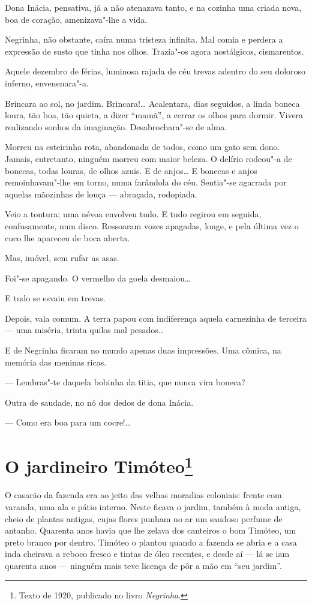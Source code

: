 Dona Inácia, pensativa, já a não atenazava tanto, e na cozinha uma
criada nova, boa de coração, amenizava"-lhe a vida.

Negrinha, não obstante, caíra numa tristeza infinita. Mal comia e
perdera a expressão de susto que tinha nos olhos. Trazia"-os agora
nostálgicos, cismarentos.

Aquele dezembro de férias, luminosa rajada de céu trevas adentro do seu
doloroso inferno, envenenara"-a.

Brincara ao sol, no jardim. Brincara!\ldots{} Acalentara, dias seguidos, a
linda boneca loura, tão boa, tão quieta, a dizer ``mamã'', a cerrar os
olhos para dormir. Vivera realizando sonhos da imaginação.
Desabrochara"-se de alma.

Morreu na esteirinha rota, abandonada de todos, como um gato sem dono.
Jamais, entretanto, ninguém morreu com maior beleza. O delírio rodeou"-a
de bonecas, todas louras, de olhos azuis. E de anjos\ldots{} E bonecas e
anjos remoinhavam"-lhe em torno, numa farândola do céu. Sentia"-se
agarrada por aquelas mãozinhas de louça --- abraçada, rodopiada.

Veio a tontura; uma névoa envolveu tudo. E tudo regirou em seguida,
confusamente, num disco. Ressoaram vozes apagadas, longe, e pela última
vez o cuco lhe apareceu de boca aberta.

Mas, imóvel, sem rufar as asas.

Foi"-se apagando. O vermelho da goela desmaiou\ldots{}

E tudo se esvaiu em trevas.

Depois, vala comum. A terra papou com indiferença aquela carnezinha de
terceira --- uma miséria, trinta quilos mal pesados\ldots{}

E de Negrinha ficaram no mundo apenas duas impressões. Uma cômica, na
memória das meninas ricas.

--- Lembras"-te daquela bobinha da titia, que nunca vira boneca?

Outra de saudade, no nó dos dedos de dona Inácia.

--- Como era boa para um cocre!\ldots{}

\chapter{O jardineiro Timóteo\footnote[*]{Texto de 1920, publicado no livro \emph{Negrinha}.}}


O casarão da fazenda era ao jeito das velhas moradias coloniais: frente
com varanda, uma ala e pátio interno. Neste ficava o jardim, também à
moda antiga, cheio de plantas antigas, cujas flores punham no ar um
saudoso perfume de antanho. Quarenta anos havia que lhe zelava dos
canteiros o bom Timóteo, um preto branco por dentro. Timóteo o plantou
quando a fazenda se abria e a casa inda cheirava a reboco fresco e
tintas de óleo recentes, e desde aí --- lá se iam quarenta anos ---
ninguém mais teve licença de pôr a mão em ``seu jardim''.

